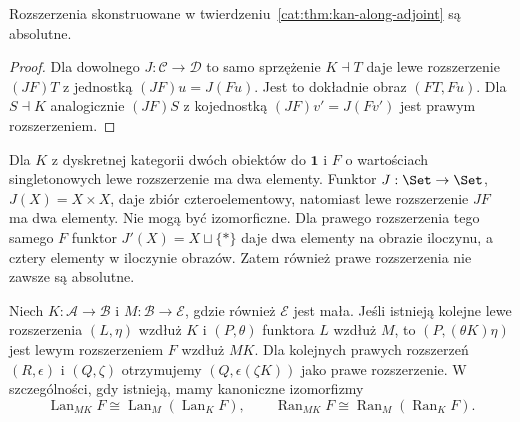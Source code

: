 \begin{wniosek}\label{cat:cor:kan-absolute}
Rozszerzenia skonstruowane w twierdzeniu~\ref{cat:thm:kan-along-adjoint} są absolutne.
\end{wniosek}
\begin{proof}
Dla dowolnego $J:\mathcal C\to\mathcal D$ to samo sprzężenie $K\dashv T$ daje lewe rozszerzenie $(JF)T$ z jednostką $(JF)u=J(Fu)$. Jest to dokładnie obraz $(FT,Fu)$. Dla $S\dashv K$ analogicznie $(JF)S$ z kojednostką $(JF)v'=J(Fv')$ jest prawym rozszerzeniem.
\end{proof}
\begin{przyklad}\label{cat:ex:kan-not-absolute}
Dla $K$ z dyskretnej kategorii dwóch obiektów do $\mathbf1$ i $F$ o wartościach singletonowych lewe rozszerzenie ma dwa elementy. Funktor $J:\Set\to\Set$, $J(X)=X\times X$, daje zbiór czteroelementowy, natomiast lewe rozszerzenie $JF$ ma dwa elementy. Nie mogą być izomorficzne. Dla prawego rozszerzenia tego samego $F$ funktor $J'(X)=X\sqcup\{*\}$ daje dwa elementy na obrazie iloczynu, a cztery elementy w iloczynie obrazów. Zatem również prawe rozszerzenia nie zawsze są absolutne.
\end{przyklad}
\begin{twierdzenie}\label{cat:thm:kan-composition}
Niech $K:\mathcal A\to\mathcal B$ i $M:\mathcal B\to\mathcal E$, gdzie również $\mathcal E$ jest mała. Jeśli istnieją kolejne lewe rozszerzenia $(L,\eta)$ wzdłuż $K$ i $(P,\theta)$ funktora $L$ wzdłuż $M$, to $(P,(\theta K)\eta)$ jest lewym rozszerzeniem $F$ wzdłuż $MK$. Dla kolejnych prawych rozszerzeń $(R,\epsilon)$ i $(Q,\zeta)$ otrzymujemy $(Q,\epsilon(\zeta K))$ jako prawe rozszerzenie. W szczególności, gdy istnieją, mamy kanoniczne izomorfizmy
\[
 \operatorname{Lan}_{MK}F\cong\operatorname{Lan}_M(\operatorname{Lan}_K F),
 \qquad
 \operatorname{Ran}_{MK}F\cong\operatorname{Ran}_M(\operatorname{Ran}_K F).
\]
\end{twierdzenie}
